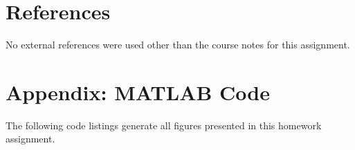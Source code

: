 \documentclass[11pt]{article}
\begin{document}
\section{References} %

No external references were used other than the course notes for this assignment.

\section*{Appendix: MATLAB Code} %

The following code listings generate all figures presented in this homework assignment.


\end{document}
